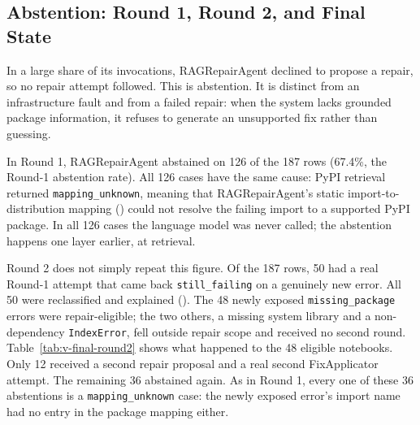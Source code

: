 \subsection{Abstention: Round 1, Round 2, and Final State}
\label{sec:v-final-abstention}

In a large share of its invocations, RAGRepairAgent declined to propose a
repair, so no repair attempt followed. This is abstention. It is
distinct from an infrastructure fault and from a failed repair: when the
system lacks grounded package information, it refuses to generate an
unsupported fix rather than guessing.

\begin{sloppypar}
In Round 1, RAGRepairAgent abstained on 126 of the 187 rows (67.4\%, the
Round-1 abstention rate). All 126 cases have the same cause: PyPI
retrieval returned \texttt{mapping\_unknown}, meaning that
RAGRepairAgent's static import-to-distribution mapping
() could not resolve the failing import to a
supported PyPI package. In all 126 cases the language model was never
called; the abstention happens one layer earlier, at retrieval.
\end{sloppypar}

Round 2 does not simply repeat this figure. Of the 187 rows, 50 had a
real Round-1 attempt that came back \texttt{still\_failing} on a genuinely
new error. All 50 were reclassified and explained
(). The 48 newly exposed
\texttt{missing\_package} errors were repair-eligible; the two others, a
missing system library and a non-dependency \texttt{IndexError}, fell
outside repair scope and received no second round.
Table~\ref{tab:v-final-round2} shows what happened to the 48 eligible
notebooks. Only 12 received a second repair proposal and a real second
FixApplicator attempt. The remaining 36 abstained again. As in Round 1,
every one of these 36 abstentions is a \texttt{mapping\_unknown} case:
the newly exposed error's import name had no entry in the package mapping
either.

